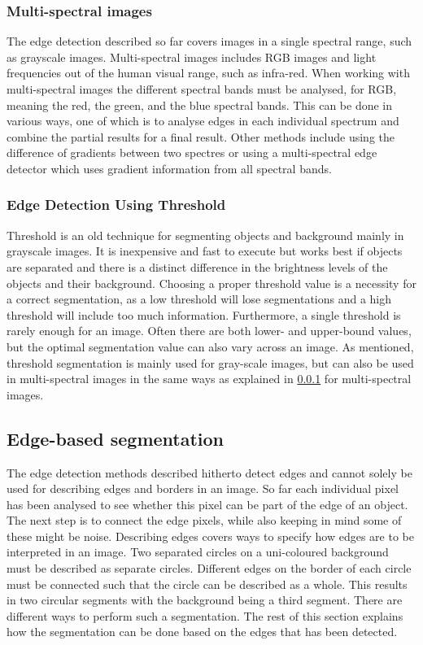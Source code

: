 \subsubsection{Multi-spectral images}\label{ssc:m-s_images}
The edge detection described so far covers images in a single spectral range, such as grayscale images. Multi-spectral images includes RGB images and light frequencies out of the human visual range, such as infra-red. When working with multi-spectral images the different spectral bands must be analysed, for RGB, meaning the red, the green, and the blue spectral bands. This can be done in various ways, one of which is to analyse edges in each individual spectrum and combine the partial results for a final result. Other methods include using the difference of gradients between two spectres or using a multi-spectral edge detector which uses gradient information from all spectral bands.

\subsubsection{Edge Detection Using Threshold}\label{ssc:edge_threshold}
Threshold is an old technique for segmenting objects and background mainly in grayscale images. It is inexpensive and fast to execute but works best if objects are separated and there is a distinct difference in the brightness levels of the objects and their background. Choosing a proper threshold value is a necessity for a correct segmentation, as a low threshold will lose segmentations and a high threshold will include too much information.
Furthermore, a single threshold is rarely enough for an image. Often there are both lower- and upper-bound values, but the optimal segmentation value can also vary across an image. As mentioned, threshold segmentation is mainly used for gray-scale images, but can also be used in multi-spectral images in the same ways as explained in \cref{ssc:m-s_images} for multi-spectral images.

\subsection{Edge-based segmentation} \label{ssc:edge_based_segmentation}
The edge detection methods described hitherto detect edges and cannot solely be used for describing edges and borders in an image. So far each individual pixel has been analysed to see whether this pixel can be part of the edge of an object. The next step is to connect the edge pixels, while also keeping in mind some of these might be noise. Describing edges covers ways to specify how edges are to be interpreted in an image. Two separated circles on a uni-coloured background must be described as separate circles. Different edges on the border of each circle must be connected such that the circle can be described as a whole. This results in two circular segments with the background being a third segment. There are different ways to perform such a segmentation. The rest of this section explains how the segmentation can be done based on the edges that has been detected.

